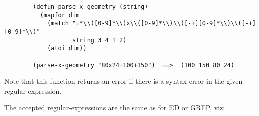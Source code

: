 {\exemplefont\begin{verbatim}
        (defun parse-x-geometry (string)
          (mapfor dim                   
            (match "=*\\([0-9]*\\)x\\([0-9]*\\)\\([-+][0-9]*\\)\\([-+][0-9]*\\)" 
                   string 3 4 1 2)
            (atoi dim))
        
        (parse-x-geometry "80x24+100+150")  ==>  (100 150 80 24)
\end{verbatim}}

Note that this function returns an error if there is a syntax error in
the given regular expression.

The accepted regular-expressions are the same as for ED or GREP, viz:

